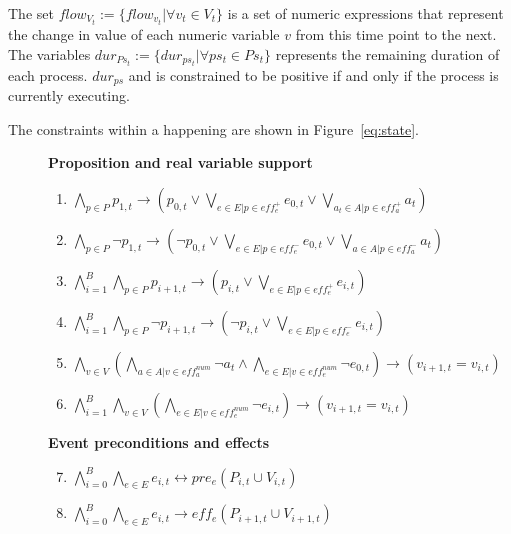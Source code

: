 The set $flow_{V_{t}}:=\{flow_{{v_t}} | \forall v_t\in V_t\}$ is a set of numeric expressions that represent the change in value of each numeric variable $v$ from this time point to the next. The variables $dur_{{Ps_t}}:=\{dur_{ps_t} | \forall ps_t\in Ps_t\}$ represents the remaining duration of each process. $dur_{ps}$ and is constrained to be positive if and only if the process is currently executing.

The constraints within a happening are shown in Figure~\ref{eq:state}. 

\begin{figure}[thb!]
\textbf{Proposition and real variable support}
\begin{enumerate}[label=H\arabic*.]
  \item $\bigwedge_{p \in P} p_{1,t} \rightarrow (p_{0,t} \vee \bigvee_{e \in E | p \in eff^{+}_{e}} e_{0,t} \vee \bigvee_{a_t \in A | p \in eff^{+}_{a}} a_t)$
  \item $\bigwedge_{p \in P} \neg p_{1,t} \rightarrow (\neg p_{0,t} \vee \bigvee_{e \in E | p \in eff^{-}_{e}} e_{0,t} \vee \bigvee_{a \in A | p \in eff^{-}_{a}} a_t)$
  \item $\bigwedge_{i=1}^{B} \bigwedge_{p \in P} p_{i+1,t}      \rightarrow (     p_{i,t} \vee \bigvee_{e \in E | p \in eff^{+}_{e}} e_{i,t})$
  \item $\bigwedge_{i=1}^{B} \bigwedge_{p \in P} \neg p_{i+1,t} \rightarrow (\neg p_{i,t} \vee \bigvee_{e \in E | p \in eff^{-}_{e}} e_{i,t})$
  \item $\bigwedge_{v \in V} (\bigwedge_{a \in A | v \in eff^{num}_{a}} \neg a_{t} \wedge \bigwedge_{e \in E | v \in eff^{num}_{e}} \neg e_{0,t}) \rightarrow (v_{i+1,t} = v_{i,t})$
  \item $\bigwedge_{i=1}^{B} \bigwedge_{v \in V} (\bigwedge_{e \in E | v \in eff^{num}_{e}} \neg e_{i,t}) \rightarrow (v_{i+1,t} = v_{i,t})$
\end{enumerate}
\textbf{Event preconditions and effects}
\begin{enumerate}[label=H\arabic*.]\setcounter{enumi}{6}
 \item $\bigwedge_{i=0}^{B} \bigwedge_{e \in E} e_{i,t} \leftrightarrow pre_{e} (P_{i,t} \cup V_{i,t})$
 \item $\bigwedge_{i=0}^{B} \bigwedge_{e \in E} e_{i,t} \rightarrow eff_{e} (P_{i+1,t} \cup V_{i+1,t})$
\end{enumerate}

\end{figure}
